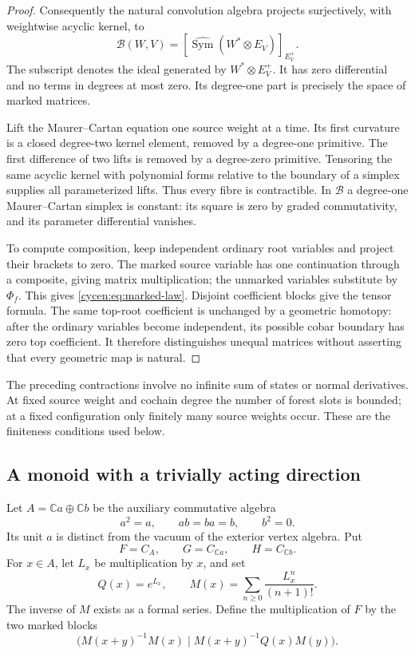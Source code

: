 \begin{proof}
Consequently the natural convolution algebra projects
surjectively, with weightwise acyclic kernel, to
\[
 \mathcal B(W,V)=
 \left[\widehat{\operatorname{Sym}}(W^*\otimes E_V)
                                      \right]_{E_V^+}.
\]
The subscript denotes the ideal generated by
$W^*\otimes E_V^+$. It has zero differential and no
terms in degrees at most zero. Its degree-one part is
precisely the space of marked matrices.

Lift the Maurer--Cartan equation one source weight at
a time. Its first curvature is a closed degree-two
kernel element, removed by a degree-one primitive.
The first difference of two lifts is removed by a
degree-zero primitive. Tensoring the same acyclic
kernel with polynomial forms relative to the boundary
of a simplex supplies all parameterized lifts.
Thus every fibre is contractible. In $\mathcal B$ a
degree-one Maurer--Cartan simplex is constant: its
square is zero by graded commutativity, and its
parameter differential vanishes.

To compute composition, keep independent ordinary root
variables and project their brackets to zero. The
marked source variable has one continuation through a
composite, giving matrix multiplication; the unmarked
variables substitute by $\Phi_f$. This gives
\eqref{cycen:eq:marked-law}. Disjoint coefficient
blocks give the tensor formula. The same top-root
coefficient is unchanged by a geometric homotopy:
after the ordinary variables become independent, its
possible cobar boundary has zero top coefficient.
It therefore distinguishes unequal matrices without
asserting that every geometric map is natural.
\end{proof}

The preceding contractions involve no infinite sum of
states or normal derivatives. At fixed source weight
and cochain degree the number of forest slots is
bounded; at a fixed configuration only finitely many
source weights occur. These are the finiteness
conditions used below.

\subsection{A monoid with a trivially acting direction}

Let $A=\mathbb C a\oplus\mathbb C b$ be the auxiliary
commutative algebra
\[
 a^2=a,\qquad ab=ba=b,\qquad b^2=0.
\]
Its unit $a$ is distinct from the vacuum of the
exterior vertex algebra. Put
\[
 F=C_A,\qquad G=C_{\mathbb C a},\qquad
 H=C_{\mathbb C b}.
\]
For $x\in A$, let $L_x$ be multiplication by $x$, and set
\[
 Q(x)=e^{L_x},\qquad
 M(x)=\sum_{n\geq0}\frac{L_x^n}{(n+1)!}.
\]
The inverse of $M$ exists as a formal series. Define
the multiplication of $F$ by the two marked blocks
\begin{equation}\label{cycen:eq:frame-product}
 \bigl(M(x+y)^{-1}M(x)\mid
              M(x+y)^{-1}Q(x)M(y)\bigr).
\end{equation}

